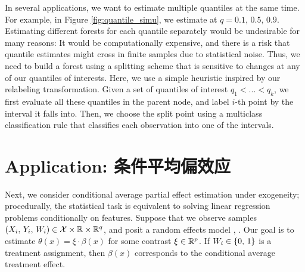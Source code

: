 \documentclass[aos]{imsart}
\theoremstyle{plain}
\theoremstyle{definition}
\theoremstyle{remark}
\begin{document}
\begin{CJK}{UTF8}{gbsn}
In several applications, we want to estimate multiple quantiles
at the same time. For example, in Figure \ref{fig:quantile_simu}, we estimate at $q = 0.1, \, 0.5, \, 0.9$.
Estimating different forests for each quantile separately would be undesirable
for many reasons: It would be computationally expensive, and there is a risk that quantile
estimates might cross in finite samples due to statistical noise. Thus, we need to build a forest using
a splitting scheme that is sensitive to changes at any of our quantiles of interests.
Here, we use a simple heuristic inspired by our relabeling transformation.
Given a set of quantiles of interest $q_1 < ... < q_k$, we first evaluate all these quantiles
  in the parent node, and label $i$-th point by the
interval \smash{$[\htheta_{q_{j - 1}, P(X_i)}, \, \htheta_{q_{j}, P(X_i)})$} it falls into. Then, we choose the
split point using a multiclass classification rule that classifies each observation into one of the intervals.


\section{Application: 条件平均偏效应}
\label{sec:cape}

Next, we consider conditional average partial effect estimation under
exogeneity; procedurally, the statistical task is equivalent to solving linear regression problems
conditionally on features. Suppose that we observe samples
$(X_i, \, Y_i, \, W_i) \in \mathcal{X} \times \mathbb{R} \times \mathbb{R}^q$, and posit a random effects model
, .
Our goal is to estimate $\theta(x) = \xi \cdot \beta(x)$ for some contrast $\xi \in \mathbb{R}^p$.
If $W_i \in \left\{0, \, 1\right\}$ is a treatment assignment, then $\beta(x)$ corresponds to the
conditional average treatment effect.


\end{CJK}
\end{document}
